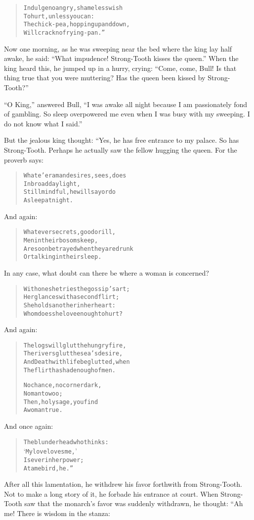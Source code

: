 \documentclass[article, twoside, 14pt]{memoir}
\renewenvironment{verbatim}{%
\begin{quote}%
\vskip -10pt%
\begin{alltt}\normalfont\large}{\end{alltt}%
\end{quote}%
\vskip -10pt
} %
\begin{document}
\begin{verbatim}
Indulge no angry, shameless wish
    To hurt, unless you can:
The chick-pea, hopping up and down,
    Will crack no frying-pan.”
\end{verbatim}
Now one morning, as he was sweeping near the bed where the
king lay half awake, he said:
``What impudence! Strong-Tooth kisses the queen.'' When the king
heard this, he jumped up in a hurry, crying:
``Come, come, Bull! Is that thing true that you were muttering? Has the queen been kissed by Strong-Tooth?''

``O King,'' answered Bull,
``I was awake all night because I am passionately fond of gambling. So sleep overpowered me even when I was busy with my sweeping. I do not know what I said.''

But the jealous king thought: “Yes, he has free entrance to my
palace. So has Strong-Tooth. Perhaps he actually saw the fellow
hugging the queen. For the proverb says:

\begin{verbatim}
Whate'er a man desires, sees, does
    In broad daylight,
Still mindful, he will say or do
    Asleep at night.
\end{verbatim}
And again:

\begin{verbatim}
Whatever secrets, good or ill,
Men in their bosoms keep,
Are soon betrayed when they are drunk
Or talking in their sleep.
\end{verbatim}
In any case, what doubt can there be where a woman is concerned?

\begin{verbatim}
With one she tries the gossip's art;
    Her glances with a second flirt;
She holds another in her heart:
    Whom does she love enough to hurt?
\end{verbatim}
And again:

\begin{verbatim}
The logs will glut the hungry fire,
The rivers glut the sea's desire,
And Death with life be glutted, when
The flirt has had enough of men.

No chance, no corner dark,
    No man to woo;
Then, holy sage, you find
    A woman true.
\end{verbatim}
And once again:

\begin{verbatim}
The blunderhead who thinks:
    ‘My love loves me,’
Is ever in her power;
    A tame bird, he.”
\end{verbatim}
After all this lamentation, he withdrew his favor forthwith from
Strong-Tooth. Not to make a long story of it, he forbade his
entrance at court. When Strong-Tooth saw that the monarch's favor
was suddenly withdrawn, he thought: “Ah me! There is wisdom in the
stanza:
\end{document}
